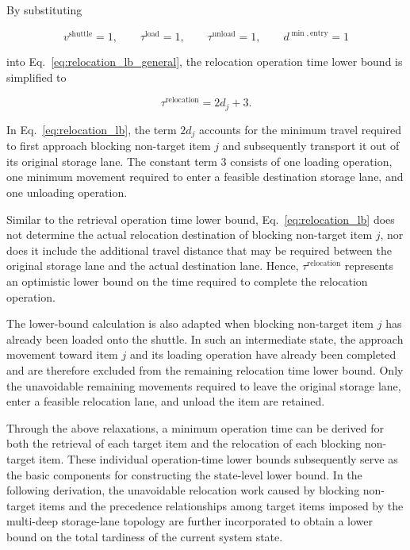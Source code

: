 By substituting

\[
v^{\mathrm{shuttle}}=1,
\qquad
\tau^{\mathrm{load}}=1,
\qquad
\tau^{\mathrm{unload}}=1,
\qquad
d^{\min,\mathrm{entry}}=1
\]

into Eq.~\eqref{eq:relocation_lb_general}, the relocation operation time lower bound is simplified to

\begin{equation}
\boxed{
\tau^{\mathrm{relocation}}
=
2d_j
+
3
}.
\label{eq:relocation_lb}
\end{equation}

In Eq.~\eqref{eq:relocation_lb}, the term \(2d_j\) accounts for the minimum travel required to first approach blocking non-target item \(j\) and subsequently transport it out of its original storage lane. The constant term \(3\) consists of one loading operation, one minimum movement required to enter a feasible destination storage lane, and one unloading operation.

Similar to the retrieval operation time lower bound, Eq.~\eqref{eq:relocation_lb} does not determine the actual relocation destination of blocking non-target item \(j\), nor does it include the additional travel distance that may be required between the original storage lane and the actual destination lane. Hence, \(\tau^{\mathrm{relocation}}\) represents an optimistic lower bound on the time required to complete the relocation operation.

The lower-bound calculation is also adapted when blocking non-target item \(j\) has already been loaded onto the shuttle. In such an intermediate state, the approach movement toward item \(j\) and its loading operation have already been completed and are therefore excluded from the remaining relocation time lower bound. Only the unavoidable remaining movements required to leave the original storage lane, enter a feasible relocation lane, and unload the item are retained.

Through the above relaxations, a minimum operation time can be derived for both the retrieval of each target item and the relocation of each blocking non-target item. These individual operation-time lower bounds subsequently serve as the basic components for constructing the state-level lower bound. In the following derivation, the unavoidable relocation work caused by blocking non-target items and the precedence relationships among target items imposed by the multi-deep storage-lane topology are further incorporated to obtain a lower bound on the total tardiness of the current system state.

